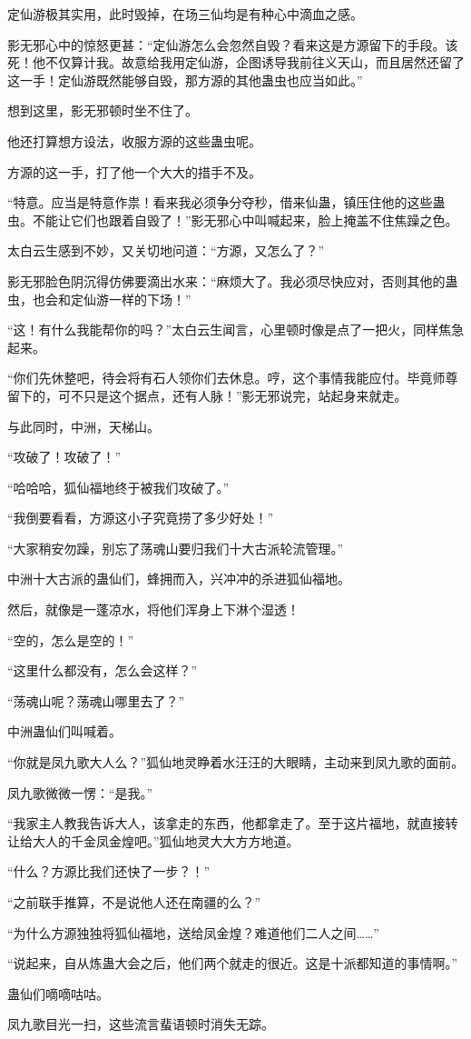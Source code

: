 \begin{this_body}
定仙游极其实用，此时毁掉，在场三仙均是有种心中滴血之感。

影无邪心中的惊怒更甚：“定仙游怎么会忽然自毁？看来这是方源留下的手段。该死！他不仅算计我。故意给我用定仙游，企图诱导我前往义天山，而且居然还留了这一手！定仙游既然能够自毁，那方源的其他蛊虫也应当如此。”

想到这里，影无邪顿时坐不住了。

他还打算想方设法，收服方源的这些蛊虫呢。

方源的这一手，打了他一个大大的措手不及。

“特意。应当是特意作祟！看来我必须争分夺秒，借来仙蛊，镇压住他的这些蛊虫。不能让它们也跟着自毁了！”影无邪心中叫喊起来，脸上掩盖不住焦躁之色。

太白云生感到不妙，又关切地问道：“方源，又怎么了？”

影无邪脸色阴沉得仿佛要滴出水来：“麻烦大了。我必须尽快应对，否则其他的蛊虫，也会和定仙游一样的下场！”

“这！有什么我能帮你的吗？”太白云生闻言，心里顿时像是点了一把火，同样焦急起来。

“你们先休整吧，待会将有石人领你们去休息。哼，这个事情我能应付。毕竟师尊留下的，可不只是这个据点，还有人脉！”影无邪说完，站起身来就走。

与此同时，中洲，天梯山。

“攻破了！攻破了！”

“哈哈哈，狐仙福地终于被我们攻破了。”

“我倒要看看，方源这小子究竟捞了多少好处！”

“大家稍安勿躁，别忘了荡魂山要归我们十大古派轮流管理。”

中洲十大古派的蛊仙们，蜂拥而入，兴冲冲的杀进狐仙福地。

然后，就像是一蓬凉水，将他们浑身上下淋个湿透！

“空的，怎么是空的！”

“这里什么都没有，怎么会这样？”

“荡魂山呢？荡魂山哪里去了？”

中洲蛊仙们叫喊着。

“你就是凤九歌大人么？”狐仙地灵睁着水汪汪的大眼睛，主动来到凤九歌的面前。

凤九歌微微一愣：“是我。”

“我家主人教我告诉大人，该拿走的东西，他都拿走了。至于这片福地，就直接转让给大人的千金凤金煌吧。”狐仙地灵大大方方地道。

“什么？方源比我们还快了一步？！”

“之前联手推算，不是说他人还在南疆的么？”

“为什么方源独独将狐仙福地，送给凤金煌？难道他们二人之间……”

“说起来，自从炼蛊大会之后，他们两个就走的很近。这是十派都知道的事情啊。”

蛊仙们嘀嘀咕咕。

凤九歌目光一扫，这些流言蜚语顿时消失无踪。

\end{this_body}

